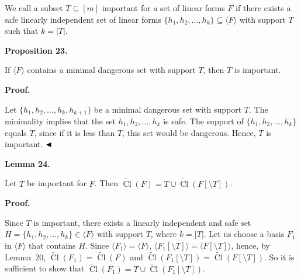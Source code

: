 We call a subset $T\subseteq[m]$ important for a set of linear forms $F$ if there exists a safe linearly independent set of linear forms $\{h_{1},h_{2},\dots,h_{k}\}\subseteq\langle F\rangle$ with support $T$ such that $k=|T|$.\par



\par\medskip\noindent\textbf{
Proposition 23.
}\par



If $\langle F\rangle$ contains a minimal dangerous set with support $T$, then $T$ is important.\par



\par\medskip\noindent\textbf{Proof.}\par


Let $\{h_{1},h_{2},\dots,h_{k},h_{k+1}\}$ be a minimal dangerous set with support $T$.
The minimality implies that the set $h_{1},h_{2},\dots,h_{k}$ is safe. The support of $\{h_{1},h_{2},\dots,h_{k}\}$ equals $T$, since if it is less than $T$, this set would be dangerous. Hence, $T$ is important.
$\hfill\blacktriangleleft$\par



\par\medskip\noindent\textbf{
Lemma 24.
}\par



Let $T$ be important for $F$. Then $\widetilde{\mathop{\mathrm{Cl}}}(F)=T\cup\widetilde{\mathop{\mathrm{Cl}}}(F[\setminus T])$.\par



\par\medskip\noindent\textbf{Proof.}\par


Since $T$ is important, there exists a linearly independent and safe set $H=\{h_{1},h_{2},\dots,h_{k}\}\in\langle F\rangle$ with support $T$, where $k=|T|$. Let us choose a basis $F_{1}$ in $\langle F\rangle$ that contains $H$. Since $\langle F_{1}\rangle=\langle F\rangle$, $\langle F_{1}[\setminus T]\rangle=\langle F[\setminus T]\rangle$, hence, by Lemma 20, $\widetilde{\mathop{\mathrm{Cl}}}(F_{1})=\widetilde{\mathop{\mathrm{Cl}}}(F)$ and $\widetilde{\mathop{\mathrm{Cl}}}(F_{1}[\setminus T])=\widetilde{\mathop{\mathrm{Cl}}}(F[\setminus T])$. So it is sufficient to show that $\widetilde{\mathop{\mathrm{Cl}}}(F_{1})=T\cup\widetilde{\mathop{\mathrm{Cl}}}(F_{1}[\setminus T])$.\par




